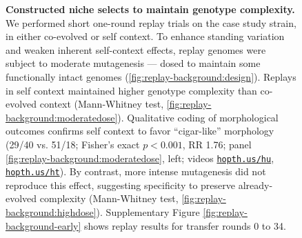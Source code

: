 \begin{figure}
\vspace{-2ex}
\caption{%
\textbf{Constructed niche selects to maintain genotype complexity.}
\footnotesize
We performed short one-round replay trials on the case study strain, in either co-evolved or self context.
To enhance standing variation and weaken inherent self-context effects, replay genomes were subject to moderate mutagenesis --- dosed to maintain some functionally intact genomes (\ref{fig:replay-background:design}).
Replays in self context maintained higher genotype complexity than co-evolved context (Mann-Whitney test, \ref{fig:replay-background:moderatedose}).
Qualitative coding of morphological outcomes confirms self context to favor ``cigar-like'' morphology (29/40 vs. 51/18; Fisher's exact $p<0.001$, RR 1.76; panel \ref{fig:replay-background:moderatedose}, left; videos \href{https://hopth.us/hu}{\texttt{hopth.us/hu}}, \href{https://hopth.us/ht}{\texttt{hopth.us/ht}}).
By contrast, more intense mutagenesis did not reproduce this effect, suggesting specificity to preserve already-evolved complexity (Mann-Whitney test, \ref{fig:replay-background:highdose}\protect\footnotemark).
Supplementary Figure \ref{fig:replay-background-early} shows replay results for transfer rounds 0 to 34.
}
\label{fig:replay-background}

\end{figure}

